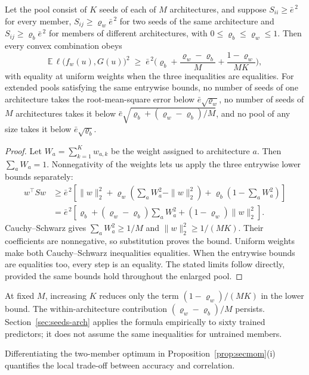 \documentclass[twoside,11pt]{article}
\begin{document}
\begin{theorem}\label{thm:blockfloor}
Let the pool consist of $K$ seeds of each of $M$ architectures, and suppose
$S_{ii}\ge\bar e^{\,2}$ for every member, $S_{ij}\ge\varrho_w\bar e^{\,2}$
for two seeds of the same architecture and $S_{ij}\ge\varrho_b\bar e^{\,2}$
for members of different architectures, with $0\le\varrho_b\le\varrho_w\le1$.
Then every convex combination obeys
\[
\mathbb E\,\ell\big(f_w(u),G(u)\big)^2\;\ge\;\bar e^{\,2}\Big(\varrho_b
+\frac{\varrho_w-\varrho_b}{M}+\frac{1-\varrho_w}{MK}\Big),
\]
with equality at uniform weights when the three inequalities are equalities.
For extended pools satisfying the same entrywise bounds, no number of seeds of one architecture takes the
root-mean-square error below $\bar e\sqrt{\varrho_w}$, no number of seeds of
$M$ architectures takes it below
$\bar e\sqrt{\varrho_b+(\varrho_w-\varrho_b)/M}$, and no pool of any size
takes it below $\bar e\sqrt{\varrho_b}$.
\end{theorem}
\begin{proof}
Let $W_a=\sum_{k=1}^K w_{a,k}$ be the weight assigned to architecture $a$.
Then $\sum_aW_a=1$. Nonnegativity of the weights lets us apply the three
entrywise lower bounds separately:
\begin{align*}
w^\top Sw
&\ge \bar e^{\,2}\left[
 \|w\|_2^2+\varrho_w\left(\sum_aW_a^2-\|w\|_2^2\right)
 +\varrho_b\left(1-\sum_aW_a^2\right)\right]\\
&=\bar e^{\,2}\left[
 \varrho_b+(\varrho_w-\varrho_b)\sum_aW_a^2
 +(1-\varrho_w)\|w\|_2^2\right].
\end{align*}
Cauchy--Schwarz gives $\sum_aW_a^2\ge1/M$ and
$\|w\|_2^2\ge1/(MK)$. Their coefficients are nonnegative, so substitution
proves the bound. Uniform weights make both Cauchy--Schwarz inequalities
equalities. When the entrywise bounds are equalities too, every step is
an equality. The stated limits follow directly, provided the same bounds
hold throughout the enlarged pool.
\end{proof}


At fixed $M$, increasing $K$ reduces only the term $(1-\varrho_w)/(MK)$ in the lower bound. The within-architecture contribution $(\varrho_w-\varrho_b)/M$ persists. Section~\ref{sec:seeds-arch} applies the formula empirically to sixty trained predictors; it does not assume the same inequalities for untrained members.

Differentiating the two-member optimum in Proposition~\ref{prop:secmom}(i)
quantifies the local trade-off between accuracy and correlation.
\end{document}
